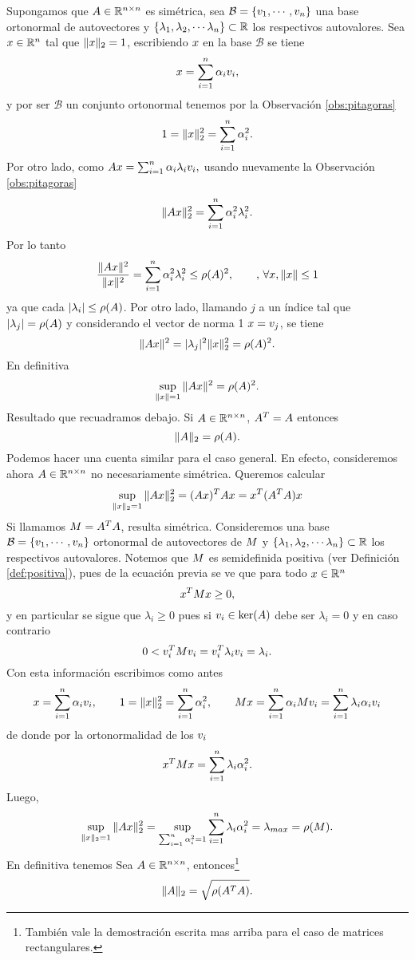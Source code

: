 \etcc
Supongamos que $\Ab\in \Rnn$ es simétrica, sea $\mathcal{B}=\{\vb_1,\cdots,\vb_n\}$ una base ortonormal de autovectores y  $\{\lambda_1, \lambda_2,\cdots \lambda_n\}\subset \mathbb R$ los respectivos autovalores. 
Sea $\xb\in\R^n$ tal que $\|\xb\|_2=1$, escribiendo $\xb$ en la base $\mathcal{B}$ se tiene
$$
\xb=\sum_{i=1}^n\alpha_i\vb_i,
$$
y por ser $\mathcal{B}$ un conjunto ortonormal tenemos por la Observación \ref{obs:pitagoras}
$$
1=\|\xb\|_2^2=\sum_{i=1}^n\alpha_i^2.
$$
Por otro lado, como $\Ab\xb=\sum_{i=1}^n\alpha_i\lambda_i\vb_i,
$ usando nuevamente la  Observación \ref{obs:pitagoras}
$$
\|\Ab\xb\|_2^2=\sum_{i=1}^n\alpha_i^2\lambda_i^2. 
$$
Por lo tanto
$$
\frac{\|\Ab\xb\|^2}{\|\xb\|^2}=\sum_{i=1}^n\alpha_i^2\lambda_i^2\le \rho(\Ab)^2,\qquad, \, \forall \xb, \|\xb\|\le 1
$$
ya que cada $|\lambda_i|\le \rho(\Ab)$. Por otro lado, llamando $j$ a un índice tal que $|\lambda_j|=\rho(\Ab)$ y considerando el vector de norma 1 $\xb=\vb_j$, se tiene 
$$
\|\Ab\xb\|^2=|\lambda_j|^2\|\xb\|_2^2=\rho(\Ab)^2.
$$
En definitiva
$$
\sup_{\|\xb\|=1}\|\Ab\xb\|^2=\rho(\Ab)^2.
$$
Resultado que recuadramos debajo.
\tcc
Si  $\Ab\in \Rnn$, $\Ab^T=\Ab$ entonces
$$
\|\Ab\|_2=\rho(\Ab).
$$
\etcc
Podemos hacer una cuenta similar para el caso general. En efecto, consideremos ahora $\Ab\in \R^{n\times n}$ no necesariamente simétrica.
Queremos calcular
$$
\sup_{\|\xb\|_2=1}\|\Ab\xb\|_2^2=(\Ab\xb)^T\Ab\xb=\xb^T(\Ab^T\Ab)\xb
$$
Si llamamos $\Mb=\Ab^T\Ab$, resulta simétrica. Consideremos una base  $\mathcal{B}=\{\vb_1,\cdots,\vb_n\}$  ortonormal de autovectores de $\Mb$ y  $\{\lambda_1, \lambda_2,\cdots \lambda_n\}\subset \mathbb R$ los respectivos autovalores. Notemos que $\Mb$ es semidefinida positiva (ver Definición \ref{def:positiva}), pues de la ecuación previa se ve que para todo $\xb\in \Rn$
$$
\xb^T\Mb\xb\ge 0,
$$
y en particular se sigue que $\lambda_i\ge 0$ pues si $\vb_i\in \ker(\Ab)$ debe ser $\lambda_i=0$ y en caso contrario
$$
0<\vb_i^T\Mb\vb_i=\vb_i^T\lambda_i\vb_i =\lambda_i.
$$
Con esta información escribimos como antes
$$
\xb=\sum_{i=1}^n\alpha_i\vb_i,
\qquad 1=\|\xb\|_2^2=\sum_{i=1}^n\alpha_i^2, \qquad \Mb\xb=\sum_{i=1}^n\alpha_i\Mb\vb_i=\sum_{i=1}^n\lambda_i\alpha_i\vb_i
$$
de donde por la ortonormalidad de los $\vb_i$
$$ 
\xb^T\Mb\xb=\sum_{i=1}^n\lambda_i\alpha_i^2.
$$
Luego,
$$
\sup_{\|\xb\|_2=1}\|\Ab\xb\|_2^2=\sup_{\sum_{i=1}^n\alpha_i^2=1}\sum_{i=1}^n\lambda_i\alpha_i^2=\lambda_{max}=\rho(\Mb).
$$
En definitiva tenemos
\tcc
Sea $\Ab\in \Rnn$, entonces\footnote{También vale la demostración escrita mas arriba para el caso de matrices rectangulares.}
$$
\|\Ab\|_2=\sqrt{\rho(\Ab^T\Ab)}.
$$
